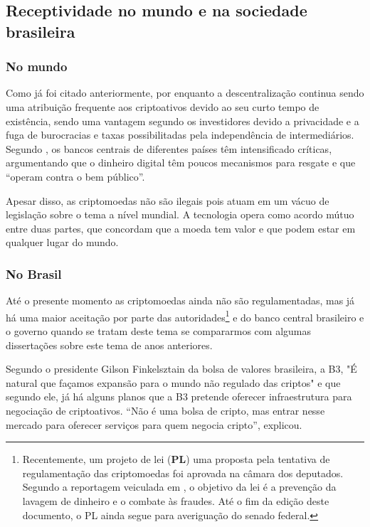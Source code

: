 \subsection{Receptividade no mundo e na sociedade brasileira}

\subsubsection{No mundo}
Como já foi citado anteriormente, por enquanto a descentralização continua sendo uma atribuição  frequente aos criptoativos devido ao seu curto tempo de existência, sendo uma vantagem segundo os investidores devido a privacidade e a fuga de burocracias e taxas possibilitadas pela independência de intermediários. Segundo \cite{NP}, os bancos centrais de diferentes países têm intensificado críticas, argumentando que o dinheiro digital têm poucos mecanismos para resgate e que “operam contra o bem público”. 

\begin{citacao}
	Apesar disso, as criptomoedas não são ilegais pois atuam em um vácuo de legislação sobre o tema a nível mundial. A tecnologia opera como acordo mútuo entre duas partes, que concordam que a moeda tem valor e que podem estar em qualquer lugar do mundo. \cite{NP}
	\end{citacao}   

\subsubsection{No Brasil} 
Até o presente momento as criptomoedas ainda não são regulamentadas, mas já há uma maior aceitação por parte das autoridades\footnote{Recentemente, um projeto de lei (\textbf{PL}) uma proposta pela tentativa de regulamentação das criptomoedas foi aprovada na câmara dos deputados. Segundo a reportagem veiculada em \cite{JORNALBR}, o objetivo da lei é a prevenção da lavagem de dinheiro e o combate às fraudes. Até o fim da edição deste documento, o PL ainda segue para averiguação do senado federal. } e do banco central brasileiro e o governo quando se tratam deste tema se compararmos com algumas dissertações sobre este tema de anos anteriores. 

Segundo o presidente Gilson Finkelsztain da bolsa de valores brasileira, a B3, "É natural que façamos expansão para o mundo não regulado das criptos" e que segundo ele, já há alguns planos que a B3 pretende oferecer infraestrutura para negociação de criptoativos. “Não é uma bolsa de cripto, mas entrar nesse mercado para oferecer serviços para quem negocia cripto”, explicou. \cite{B3} 

